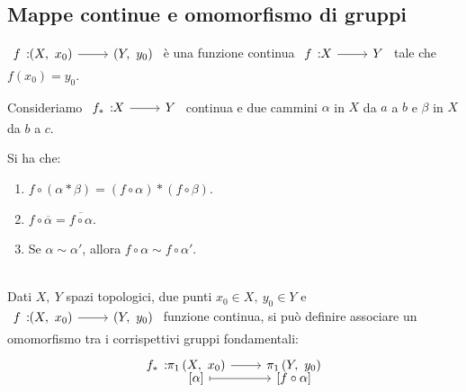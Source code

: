 \subsection{Mappe continue e omomorfismo di gruppi}
\begin{notate}
	$\funz{f}{\left(X,\ x_0\right)}{\left(Y,\ y_0\right)}$ è una funzione continua $\funz{f}{X}{Y}$ tale che $f\left(x_0\right)=y_0$.
\end{notate}
\begin{observe}
Consideriamo $\funz{f_\ast}{X}{Y}$ continua e due cammini $\alpha$ in $X$ da $a$ a $b$ e $\beta$ in $X$ da $b$ a $c$.
\begin{center}
\end{center}
Si ha che:
\begin{enumerate}
\item $f\circ \left(\alpha\ast\beta\right)=\left(f\circ\alpha\right)\ast\left(f\circ \beta\right)$.
\item $f\circ\overline{\alpha}=\overline{f\circ\alpha}$.
\item Se $\alpha\sim\alpha'$, allora $f\circ\alpha\sim f\circ\alpha'$.
\end{enumerate}
\vspace{-3mm}
\end{observe}
\begin{proposition}~{}\\
	Dati $X,\ Y$ spazi topologici, due punti $x_0\in X,\ y_0\in Y$ e $\funz{f}{\left(X,\ x_0\right)}{\left(Y,\ y_0\right)}$ funzione continua, si può definire associare un omomorfismo tra i corrispettivi gruppi fondamentali:
	\begin{equation}
		\funztot{f_{\ast}}{\gruf{X}{x_0}}{\gruf{Y}{y_0}}{\left[\alpha\right]}{\left[f\circ\alpha\right]}
	\end{equation}
\vspace{-6mm}
\end{proposition}
